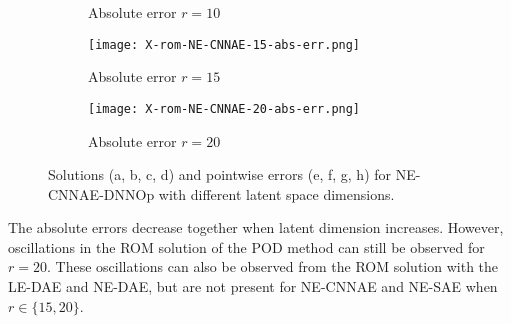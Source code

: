 \begin{figure}[!htb]
\begin{center}
\begin{subfigure}[b]{0.23\textwidth}
            \caption{Absolute error $r = 10$}
        \end{subfigure}   
        \begin{subfigure}[b]{0.23\textwidth}
            \begin{center}
                \texttt{[image: X-rom-NE-CNNAE-15-abs-err.png]}
            \end{center}
            \caption{Absolute error $r = 15$}
        \end{subfigure}    
        \begin{subfigure}[b]{0.23\textwidth}
            \begin{center}
                \texttt{[image: X-rom-NE-CNNAE-20-abs-err.png]}
            \end{center}
            \caption{Absolute error $r = 20$}
        \end{subfigure}
     \end{center}
     \caption[Solutions and pointwise errors for NE-CNNAE-DNNOp.]{Solutions (a, b, c, d) and pointwise errors (e, f, g, h) for NE-CNNAE-DNNOp with different latent space dimensions.}
        \label{fig: necnnae-burger}
\end{figure}

The absolute errors decrease together when latent dimension increases. However, oscillations in the ROM solution of the POD method can still be observed for $r = 20$. These oscillations can also be observed from the ROM solution with the LE-DAE and NE-DAE, but are not present for NE-CNNAE and NE-SAE when $r \in \{15, 20\}$.

